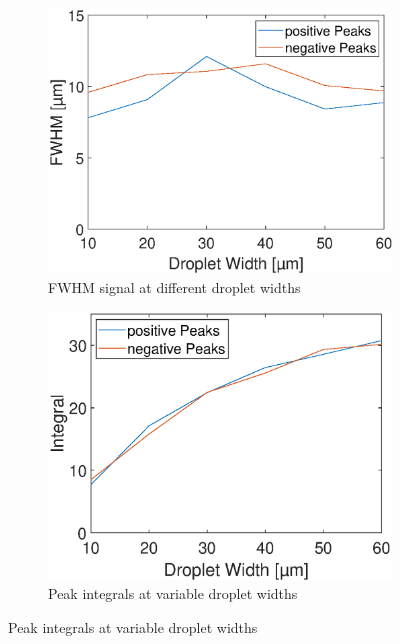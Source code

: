 \begin{figure}[h!]
	\begin{subfigure}[l]{0.49\linewidth} 
		\centering
		\includegraphics[clip,trim={0mm 0mm 0mm 0mm}, width=\linewidth]{Ressourcen/Results/W/W_FWHM}
		\caption{FWHM signal at different droplet widths}
		\label{fig:sim:w:FWHM}
	\end{subfigure}
	\hfil
	\begin{subfigure}[r]{0.49\linewidth} 
		\centering
		\includegraphics[clip,trim={0mm 0mm 0mm 0mm}, width=\linewidth]{Ressourcen/Results/W/W_Int}
		\caption{Peak integrals at variable droplet widths}
		\label{fig:sim:w:int}
	\end{subfigure}

\end{figure}
